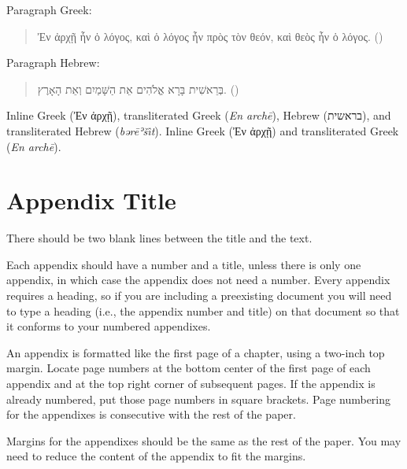 \documentclass[letterpaper,12pt,oneside,openany]{book}
\begin{document}
Paragraph Greek:
\begin{quote}
  Ἐν ἀρχῇ ἦν ὁ λόγος, καὶ ὁ λόγος ἦν πρὸς τὸν θεόν, καὶ θεὸς ἦν ὁ λόγος.
  \foreignlanguage{american}{()}
\end{quote}
\ifxetexorluatex
  Paragraph Hebrew:
  \begin{quote}
    \ifxetex
      \raggedleft
    \fi
    בְּרֵאשִׁית בָּרָא אֱלֹהִים אֵת הַשָּׁמַיִם וְאֵת הָאָרֶץ.
    \foreignlanguage{american}{()}
  \end{quote}
\fi
\ifxetexorluatex
  Inline Greek (\foreignlanguage{greek}{Ἐν ἀρχῇ}),
  transliterated Greek (\emph{En archē}),
  Hebrew (\foreignlanguage{hebrew}{בראשית}), and
  transliterated Hebrew (\emph{bərēʾšı̂t}).
\else
  Inline Greek (\foreignlanguage{greek}{Ἐν ἀρχῇ}) and
  transliterated Greek (\emph{En archē}).
\fi

\appendix

\chapter{Appendix Title}

%
There should be two blank lines between the title and the text.

Each appendix should have a number and a title, unless there is only one
appendix, in which case the appendix does not need a number. Every appendix
requires a heading, so if you are including a preexisting document you will
need to type a heading (i.e., the appendix number and title) on that document
so that it conforms to your numbered appendixes.

An appendix is formatted like the first page of a chapter, using a two-inch
top margin. Locate page numbers at the bottom center of the first page of each
appendix and at the top right corner of subsequent pages. If the appendix is
already numbered, put those page numbers in square brackets. Page numbering
for the appendixes is consecutive with the rest of the paper.

Margins for the appendixes should be the same as the rest of the paper. You
may need to reduce the content of the appendix to fit the margins.

\backmatter

\printbibliography[heading=bibintoc]

\singlespacing

\printindex


\end{document}
